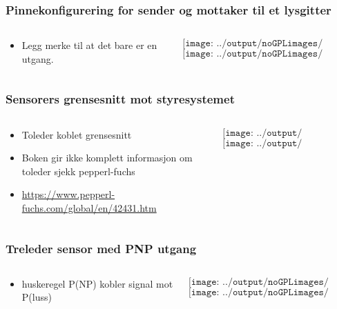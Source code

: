 \documentclass[aspectratio=169,xcolor=dvipsnames]{beamer}
\begin{document}
\begin{frame}
	\frametitle{Pinnekonfigurering for sender og mottaker til et lysgitter}
	\begin{columns}
		\begin{column}{0.5\textwidth}
			\begin{itemize}
				\item Legg merke til at det bare er en utgang. 
			\end{itemize}

			
		\end{column}

		\begin{column}{0.5\textwidth}
	$$\texttt{[image: ../output/noGPLimages/limit44.png]}$$
	$$\texttt{[image: ../output/noGPLimages/limit43.png]}$$
		\end{column}
	\end{columns}
\end{frame}
\begin{frame}
	\frametitle{Sensorers grensesnitt mot styresystemet}
	\begin{columns}
		\begin{column}{0.5\textwidth}
			\begin{itemize} 
				\item Toleder koblet grensesnitt
				\item Boken gir ikke komplett informasjon om toleder sjekk pepperl-fuchs
				\item \url{https://www.pepperl-fuchs.com/global/en/42431.htm}
			\end{itemize}

			
		\end{column}

		\begin{column}{0.5\textwidth}
	$$\texttt{[image: ../output/noGPLimages/limit45.png]}$$
	$$\texttt{[image: ../output/noGPLimages/limit43.jpg]}$$
		\end{column}
	\end{columns}
\end{frame}
\begin{frame}
	\frametitle{Treleder sensor med PNP utgang}
	\begin{columns}
		\begin{column}{0.5\textwidth}
			\begin{itemize}
				\item huskeregel P(NP) kobler signal mot P(luss)
			\end{itemize}

			
		\end{column}

		\begin{column}{0.5\textwidth}
	$$\texttt{[image: ../output/noGPLimages/limit46.png]}$$
	$$\texttt{[image: ../output/noGPLimages/limit47.png]}$$
		\end{column}
	\end{columns}
\end{frame}
\end{document}
